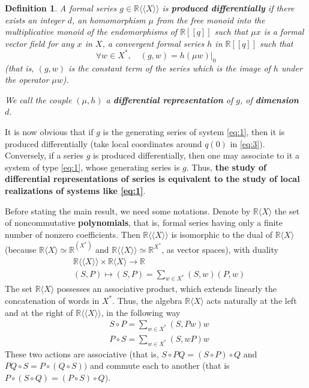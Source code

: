 \documentclass[a4paper,12pt]{article}
\newtheorem{definition}{Definition}
\newcommand{\R}{\mathbb{R}}
\newcommand{\Rx}{\R\langle X\rangle}
\newcommand{\Rxx}{\R\langle\langle X\rangle\rangle}
\begin{document}
\begin{definition}
	A formal series $g \in \Rxx$ is \textbf{produced differentially} if there exists an integer $d$, an homomorphism $\mu$ from the free monoid into the multiplicative monoid of the endomorphisms of $\R[[q]]$ such that $\mu {x}$ is a formal vector field for any $x$ in $X$, a convergent formal series $h$ in $\R[[q]]$ such that
	\begin{equation*}
		\forall w \in X^*, \quad (g, w)=\left.h(\mu w)\right|_0
	\end{equation*}
	(that is, $({g}, {w})$ is the constant term of the series which is the image of ${h}$ under the operator $\mu w$).
	
	We call the couple $(\mu, h)$ a \textbf{differential representation} of $g$, of \textbf{dimension}~$d$.
\end{definition}

It is now obvious that if ${g}$ is the generating series of system \eqref{eq:1}, then it is produced differentially (take local coordinates around ${q}(0)$ in \eqref{eq:3}). Conversely, if a series ${g}$ is produced differentially, then one may associate to it a system of type \eqref{eq:1}, whose generating series is ${g}$. Thus, \textbf{the study of differential representations of series is equivalent to the study of local realizations of systems like \eqref{eq:1}}.

Before stating the main result, we need some notations. Denote by $\Rx$ the set of noncommutative \textbf{polynomials}, that is, formal series having only a finite number of nonzero coefficients. Then $\Rxx$ is isomorphic to the dual of $\Rx$ (because $\Rx \simeq \R^{(X^*)}$ and $\Rxx \simeq \R^{X^*}$, as vector spaces), with duality
\begin{equation*}
	\begin{aligned}
		& \Rxx \times \Rx \to \R \\
		& (S, P) \mapsto (S, P)=\sum_{w \in X^*} (S, w) (P, w)
	\end{aligned}
\end{equation*}
The set $\Rx$ possesses an associative product, which extends linearly the concatenation of words in $X^*$. Thus, the algebra $\Rx$ acts naturally at the left and at the right of $\Rxx$, in the following way
\begin{equation} \label{eq:4}
	\begin{aligned}
		& S \circ P=\sum_{w \in X^*}(S, P w) w \\
		& P \circ S=\sum_{w \in X^*}(S, w P) w
	\end{aligned}
\end{equation}
These two actions are associative (that is, $S \circ P Q=(S \circ P) \circ Q$ and ${PQ} \circ {S}={P} \circ({Q} \circ {S}))$ and commute each to another (that is ${P} \circ({S} \circ {Q})=({P} \circ {S}) \circ {Q})$. 
\end{document}

